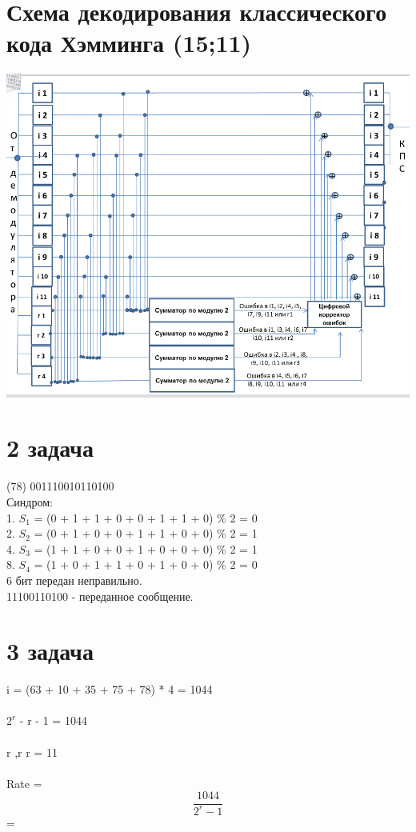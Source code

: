 \documentclass[12pt,onecolumn]{article}
\begin{document}
\section{Схема декодирования классического кода Хэмминга (15;11)}
\includegraphics[width=15cm]{img/img2.png}
\newpage
\section{2 задача}
(78) 001110010110100 \\
   Синдром:\\
   1. $S_1$ = (0 + 1 + 1 + 0 + 0 + 1 + 1 + 0) \% 2 = 0\\
   2. $S_2$ = (0 + 1 + 0 + 0 + 1 + 1 + 0 + 0) \% 2 = 1\\
   4. $S_3$ = (1 + 1 + 0 + 0 + 1 + 0 + 0 + 0) \% 2 = 1\\
   8. $S_4$ = (1 + 0 + 1 + 1 + 0 + 1 + 0 + 0) \% 2 = 0\\
   6 бит передан неправильно.\\
   11100110100 - переданное сообщение.
\newpage
\section{3 задача}
  i = (63 + 10 + 35 + 75 + 78) * 4 = 1044\\
  \\
  $2^r$ - r - 1 = 1044\\
  \\
  r  ,r \in {} \Rightarrow r  = 11\\
  \\
  Rate = $$\frac{1044}{2^r - 1}$$ =  \\
  \\
\newpage
\end{document}
